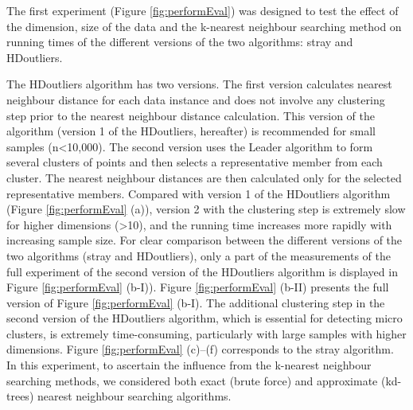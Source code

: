 \documentclass[11pt,a4paper,]{article}
\theoremstyle{definition}
\theoremstyle{definition}
\theoremstyle{definition}
\theoremstyle{remark}
\begin{document}
The first experiment (Figure \ref{fig:performEval}) was designed to test the effect of the dimension, size of the data and the k-nearest neighbour searching method on running times of the different versions of the two algorithms: stray and HDoutliers.

The HDoutliers algorithm has two versions. The first version calculates nearest neighbour distance for each data instance and does not involve any clustering step prior to the nearest neighbour distance calculation. This version of the algorithm (version 1 of the HDoutliers, hereafter) is recommended for small samples (n\textless{}10,000). The second version uses the Leader algorithm to form several clusters of points and then selects a representative member from each cluster. The nearest neighbour distances are then calculated only for the selected representative members. Compared with version 1 of the HDoutliers algorithm (Figure \ref{fig:performEval} (a)), version 2 with the clustering step is extremely slow for higher dimensions (\textgreater{}10), and the running time increases more rapidly with increasing sample size. For clear comparison between the different versions of the two algorithms (stray and HDoutliers), only a part of the measurements of the full experiment of the second version of the HDoutliers algorithm is displayed in Figure \ref{fig:performEval} (b-I)). Figure \ref{fig:performEval} (b-II) presents the full version of Figure \ref{fig:performEval} (b-I). The additional clustering step in the second version of the HDoutliers algorithm, which is essential for detecting micro clusters, is extremely time-consuming, particularly with large samples with higher dimensions. Figure \ref{fig:performEval} (c)--(f) corresponds to the stray algorithm. In this experiment, to ascertain the influence from the k-nearest neighbour searching methods, we considered both exact (brute force) and approximate (kd-trees) nearest neighbour searching algorithms.
\end{document}
